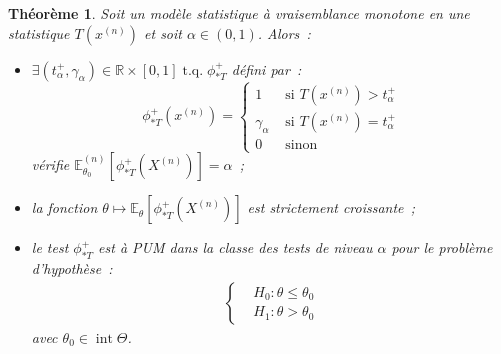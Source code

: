 \documentclass{report}
\DeclareMathOperator{\tq}{\text{ t.q. }}
\DeclareMathOperator{\intr}{int}  %
\newcommand{\E}{\mathbb E}
\newcommand{\R}{\mathbb R}
\newcommand{\n}{{(n)}}
\newcommand{\Xn}{{X^\n}}
\newtheorem{thm}{Théorème}[chapter]
\theoremstyle{definition}
\theoremstyle{remark}
\begin{document}
		\begin{thm} Soit un modèle statistique à vraisemblance monotone en une statistique $T(x^\n)$ et soit $\alpha \in (0, 1)$. Alors~:
		\begin{itemize}
			\item $\exists (t_\alpha^+, \gamma_\alpha) \in \R \times [0, 1] \tq \phi_{*T}^+$ défini par~:
			\[\phi_{*T}^+(x^\n) =
			\begin{cases}
				1 &\text{ si } T(x^\n) > t_\alpha^+ \\
				\gamma_\alpha &\text{ si } T(x^\n) = t_\alpha^+ \\
				0 &\text{ sinon}
			\end{cases}\]
			vérifie $\E_{\theta_0}^\n[\phi_{*T}^+(\Xn)] = \alpha$~;
			\item la fonction $\theta \mapsto \E_\theta[\phi_{*T}^+(\Xn)]$ est strictement croissante~;
			\item le test $\phi_{*T}^+$ est à PUM dans la classe des tests de niveau $\alpha$ pour le problème d'hypothèse~:
			\begin{align}\label{eq:test_hyp_leq_>}
				\begin{cases}
					&H_0 : \theta \leq \theta_0 \\
					&H_1 : \theta > \theta_0
				\end{cases}
			\end{align}
			avec $\theta_0 \in \intr \Theta$.
		\end{itemize}
		\end{thm}
\end{document}
